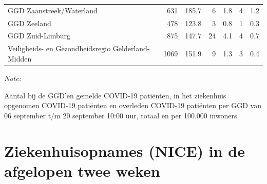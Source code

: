 \documentclass[
  english,
  man,floatsintext]{apa6}
\begin{document}
\begin{table}
\begin{threeparttable}
\begin{tabular}{lrrrrrr}
GGD Zaanstreek/Waterland & 631 & 185.7 & 6 & 1.8 & 4 & 1.2\\
GGD Zeeland & 478 & 123.8 & 3 & 0.8 & 1 & 0.3\\
GGD Zuid-Limburg & 875 & 147.7 & 24 & 4.1 & 4 & 0.7\\
Veiligheids- en Gezondheidsregio Gelderland-Midden & 1069 & 151.9 & 9 & 1.3 & 3 & 0.4\\
\bottomrule
\end{tabular}
\begin{tablenotes}
\item \textit{Note: } 
\item Aantal bij de GGD’en gemelde COVID-19 patiënten, in het ziekenhuis opgenomen COVID-19 patiënten en overleden COVID-19 patiënten per GGD van 06 september t/m 20 september 10:00 uur, totaal en per 100.000 inwoners
\end{tablenotes}
\end{threeparttable}
\endgroup{}
\end{table}

\newpage

\hypertarget{ziekenhuisopnames-nice-in-de-afgelopen-twee-weken}{%
\section{Ziekenhuisopnames (NICE) in de afgelopen twee weken}\label{ziekenhuisopnames-nice-in-de-afgelopen-twee-weken}}
\end{document}
